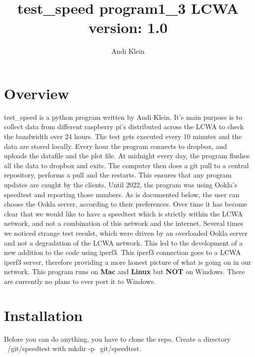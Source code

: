 \documentclass[12pt]{article}
\begin{document}
\author{ Andi Klein}
\title{ test\_speed program1\_3 LCWA \\ 
		\bf{version: 1.0}}
\maketitle
\setcounter{secnumdepth}{10}
\setcounter{tocdepth}{10}



\newenvironment{andilist}{\begin{itemize} \em}{\end{itemize}}

\section{Overview}
test\_speed is a python program written by Andi Klein. It's main purpose is to collect data from different raspberry pi's distributed across the LCWA to check the bandwidth over 24 hours. The test gets executed every 10 minutes and the data are stored locally. Every hour the program connects to dropbox, and uploads the datafile and the plot file. At midnight every day, the program flushes all the data to dropbox and exits. The computer then does a git pull to a central repository, performs a pull and the restarts. This ensures that any program updates are caught by the clients.
Until 2022, the program was using Ookla's speedtest and reporting those numbers. As is documented below, the user can choose the Ookla server, according to their preferences. Over time it has become clear that we would like to have a speedtest which is strictly within the LCWA network, and not a combination of this network and the internet. Several times we noticed strange test resulst, which were driven by an overloaded Ookla server and not a degradation of the LCWA network. This led to the development of a new addition to the code using iperf3. This iperf3 connection goes to a LCWA iperf3 server, therefore providing a more honest picture of what is going on in our network. This program runs on \textbf{Mac} and \textbf{Linux} but \textbf{NOT} on Windows. There are currently no plans to ever port it to Windows.

\section{Installation}

Before you can do anything, you have to clone the repo. Create a directory ~/git/speedtest with mkdir -p ~git/speedtest.
\end{document}
